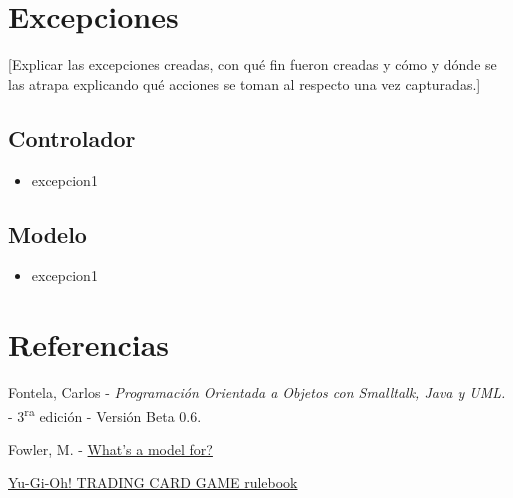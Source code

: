 \section{Excepciones}

[Explicar las excepciones creadas, con qué fin fueron creadas y cómo y
dónde se las atrapa explicando qué acciones se toman al respecto una vez
capturadas.]

\subsection{Controlador}

\begin{itemize}
\item excepcion1

\end{itemize}

\subsection{Modelo}

\begin{itemize}
\item excepcion1

\end{itemize}

\appendix
\section{Referencias}
\begingroup
\renewcommand{\section}[2]{}
\begin{thebibliography}{10}
	 Fontela, Carlos - \emph{Programación Orientada a Objetos con Smalltalk, Java y UML.} - 3\textsuperscript{ra} edición - Versión Beta 0.6.
	
	 Fowler, M. - \hyperref{https://martinfowler.com/distributedComputing/purpose.pdf}{}{}{What's a model for?}
	
	 \hyperref{https://www.yugioh-card.com/en/rulebook/SD_RuleBook_EN_10.pdf}{}{}{Yu-Gi-Oh! TRADING CARD GAME rulebook}
\end{thebibliography}
\endgroup


